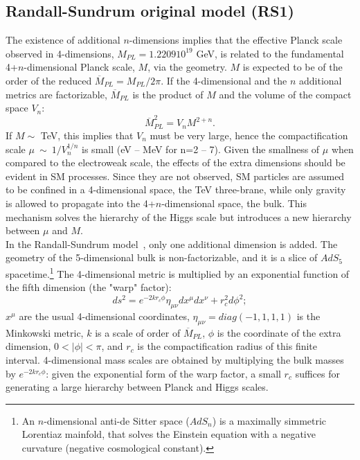 \subsection{Randall-Sundrum original model (RS1)}
\label{sec:RS1}
The existence of additional $n$-dimensions implies that the effective Planck scale observed in 4-dimensions, $M_{PL} = 1.2209 10^{19}$ GeV, is related to the fundamental 4+$n$-dimensional Planck scale, $M$, via the geometry. $M$ is expected to be of the order of the reduced $\overline{M}_{PL} = M_{PL}/2 \pi$. If the 4-dimensional and the $n$ additional metrics are factorizable, $\overline{M}_{PL}$ is the product of $M$ and the volume of the compact space $V_n$:
\begin{equation}
\overline{M}_{PL}^2 = V_n M^{2+n}.
\label{eq:theory_planck_mass}
\end{equation}
If $M \sim$ TeV, this implies that $V_n$ must be very large, hence the compactification scale $\mu~\sim~1/V_n^{1/n}$ is small (eV -- MeV for n=2 -- 7).  Given the smallness of $\mu$ when compared to the electroweak scale, the effects of the extra dimensions should be evident in SM processes. Since they are not observed, SM particles are assumed to be confined in a 4-dimensional space, the TeV three-brane, while only gravity is allowed to propagate into the 4+$n$-dimensional space, the bulk. This mechanism solves the hierarchy of the Higgs scale but introduces a new hierarchy between $\mu$ and $M$.\\
In the Randall-Sundrum model~\cite{Randall:1999ee,Randall:1999vf}, only one additional dimension is added. The geometry of the 5-dimensional bulk is non-factorizable, and it is a slice of $AdS_5$ spacetime.\footnote{An $n$-dimensional anti-de Sitter space ($AdS_n$) is a maximally simmetric Lorentiaz mainfold, that solves the Einstein equation with a negative curvature (negative cosmological constant).} The 4-dimensional metric is multiplied by an exponential function of the fifth dimension (the "warp" factor):
\begin{equation}
ds^2 = e^{-2 k r_c \phi} \eta_{\mu \nu} dx^{\mu} dx^{\nu} + r_c^2 d{\phi}^2;
\label{eq:theory_metric}
\end{equation}
$x^{\mu}$ are the usual 4-dimensional coordinates, $\eta_{\mu \nu} = diag(-1, 1, 1, 1)$ is the Minkowski metric, $k$ is a scale of order of $\overline{M}_{PL}$, $\phi$ is the coordinate of the extra dimension, $0 < |\phi| < \pi$, and $r_c$ is the compactification radius of this finite interval. 4-dimensional mass scales are obtained by multiplying the bulk masses by $e^{-2 k r_c \phi}$: given the exponential form of the warp factor, a small $r_c$ suffices for generating a large hierarchy between Planck and Higgs scales.\\
